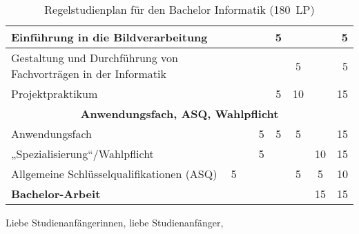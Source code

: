 \begin{table}[tbp]
\begin{small}
\begin{tabularx}{\textwidth}{|X||c|c|c|c|c|c||r|}
			Einführung in die Bildverarbeitung                                    &    &    &    & 5  &    &                               &                                                                     5 \\ \hline
			Gestaltung und Durchführung von Fachvorträgen in der Informatik       &    &    &    &    & 5  &                               &                                                                     5 \\ \hline
			Projektpraktikum                                                      &    &    &    & 5  & 10 &                               &                                                                    15 \\ \hline\hline
			\multicolumn{8}{|c|}{\textbf{Anwendungsfach, ASQ, Wahlpflicht}} \\ \hline
			Anwendungsfach                                                        &    &    & 5  & 5  & 5  &                               &                                                                    15 \\ \hline
			„Spezialisierung“/Wahlpflicht                                           &    &    & 5  &    &    &              10               &                                                                    15 \\ \hline
			Allgemeine Schlüsselqualifikationen (ASQ)                             & 5  &    &    &    & 5  &               5               &                                                                    10 \\ \hline\hline
			\textbf{Bachelor-Arbeit}                                              &    &    &    &    &    &              15               &                                                                    15 \\ \hline
		\end{tabularx}
	\end{small}
	\caption{Regelstudienplan für den Bachelor Informatik (180~LP)\label{plan-info}}
\end{table}

Liebe Studienanfängerinnen, liebe Studienanfänger,

